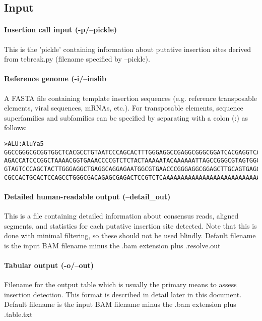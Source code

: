 \documentclass[letterpaper,11pt]{article}
\begin{document}
\subsection{Input}
\paragraph{Insertion call input (-p/--pickle)}
	This is the 'pickle' containing information about putative insertion sites derived from tebreak.py (filename specified by --pickle).
	
\paragraph{Reference genome (-i/--inslib}
A FASTA file containing template insertion sequences (e.g. reference transposable elements, viral sequences, mRNAs, etc.). For transposable elements, sequence superfamilies and subfamilies can be specified by separating with a colon (:) as follows:

\begin{verbatim}
>ALU:AluYa5
GGCCGGGCGCGGTGGCTCACGCCTGTAATCCCAGCACTTTGGGAGGCCGAGGCGGGCGGATCACGAGGTCAGGAGATCG
AGACCATCCCGGCTAAAACGGTGAAACCCCGTCTCTACTAAAAATACAAAAAATTAGCCGGGCGTAGTGGCGGGCGCCT
GTAGTCCCAGCTACTTGGGAGGCTGAGGCAGGAGAATGGCGTGAACCCGGGAGGCGGAGCTTGCAGTGAGCCGAGATCC
CGCCACTGCACTCCAGCCTGGGCGACAGAGCGAGACTCCGTCTCAAAAAAAAAAAAAAAAAAAAAAAAAAAAAAAAAAA
\end{verbatim}

\paragraph{Detailed human-readable output (--detail\_out)}
This is a file containing detailed information about consensus reads, aligned segments, and statistics for each putative insertion site detected. Note that this is done with minimal filtering, so these should not be used blindly. Default filename is the input BAM filename minus the .bam extension plus .resolve.out

\paragraph{Tabular output (-o/--out)}
Filename for the output table which is usually the primary means to assess insertion detection. This format is described in detail later in this document. Default filename is the input BAM filename minus the .bam extension plus .table.txt
\end{document}
